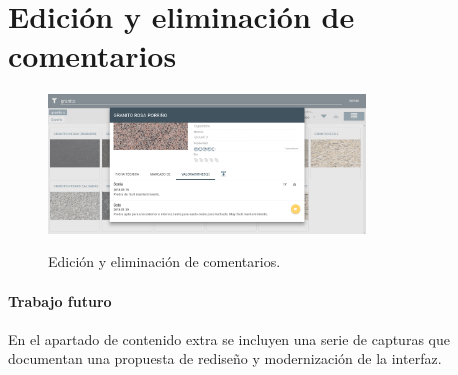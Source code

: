 \section{Edición y eliminación de comentarios}

\begin{figure}[H]
	\centering
	\includegraphics[width=0.75\textwidth]{imaxes/editComment.png}
	\label{edcom}
	\caption{Edición y eliminación de comentarios.}
\end{figure}

\paragraph{Trabajo futuro}

En el apartado de contenido extra se incluyen una serie de capturas que documentan una propuesta de rediseño y modernización de la interfaz.